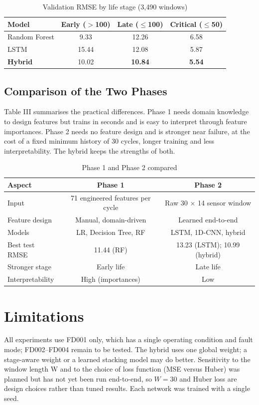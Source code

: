 \documentclass[conference]{IEEEtran}
\begin{document}
\begin{table}[!t]
\caption{Validation RMSE by life stage (3,490 windows)}
\label{tabII}
\centering
\footnotesize
\begin{tabular}{lccc}
\toprule
Model & Early ($>$100) & Late ($\le$100) & Critical ($\le$50) \\
\midrule
Random Forest & 9.33 & 12.26 & 6.58 \\
LSTM & 15.44 & 12.08 & 5.87 \\
\textbf{Hybrid} & 10.02 & \textbf{10.84} & \textbf{5.54} \\
\bottomrule
\end{tabular}
\end{table}

\subsection{Comparison of the Two Phases}
Table III summarises the practical differences. Phase 1 needs domain knowledge to design features but trains in seconds and is easy to interpret through feature importances. Phase 2 needs no feature design and is stronger near failure, at the cost of a fixed minimum history of 30 cycles, longer training and less interpretability. The hybrid keeps the strengths of both.

\begin{table}[!t]
\caption{Phase 1 and Phase 2 compared}
\label{tabIII}
\centering
\footnotesize
\begin{tabular}{lcc}
\toprule
Aspect & Phase 1 & Phase 2 \\
\midrule
Input & 71 engineered features per cycle & Raw 30 $\times$ 14 sensor window \\
Feature design & Manual, domain-driven & Learned end-to-end \\
Models & LR, Decision Tree, RF & LSTM, 1D-CNN, hybrid \\
Best test RMSE & 11.44 (RF) & 13.23 (LSTM); 10.99 (hybrid) \\
Stronger stage & Early life & Late life \\
Interpretability & High (importances) & Low \\
\bottomrule
\end{tabular}
\end{table}


\section{Limitations}
All experiments use FD001 only, which has a single operating condition and fault mode; FD002--FD004 remain to be tested. The hybrid uses one global weight; a stage-aware weight or a learned stacking model may do better. Sensitivity to the window length W and to the choice of loss function (MSE versus Huber) was planned but has not yet been run end-to-end, so $W = 30$ and Huber loss are design choices rather than tuned results. Each network was trained with a single seed.
\end{document}
